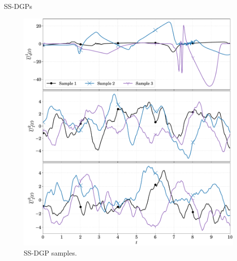 \documentclass[seriffont, cmap=Beijing, 10pt]{zz}
\begin{document}
\begin{frame}{SS-DGPs}
	\begin{figure}
		\centering
		\begin{minipage}[c]{.65\linewidth}
			\includegraphics[width=\linewidth]{../thesis_latex/figs/samples_ssdgp_m32}
		\end{minipage}
		\begin{minipage}[c]{.32\linewidth}
			\caption{SS-DGP samples.}
		\end{minipage}
	\end{figure}
\end{frame}
\end{document}
